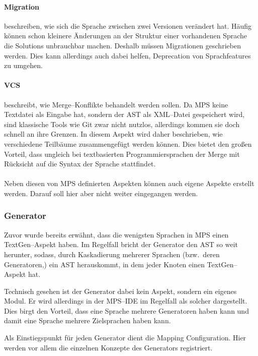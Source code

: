 \paragraph{Migration} beschreiben, wie sich die Sprache zwischen zwei Versionen verändert hat.
Häufig können schon kleinere Änderungen an der Struktur einer vorhandenen Sprache die Solutions unbrauchbar machen.
Deshalb müssen Migrationen geschrieben werden.
Dies kann allerdings auch dabei helfen, Deprecation von Sprachfeatures zu umgehen.

\paragraph{\ac{VCS}} beschreibt, wie Merge--Konflikte behandelt werden sollen.
Da \ac{MPS} keine Textdatei als Eingabe hat, sondern der \ac{AST} als \acs{XML}--Datei gespeichert wird, sind klassische Tools wie Git zwar nicht nutzlos, allerdings kommen sie doch schnell an ihre Grenzen.
In diesem Aspekt wird daher beschrieben, wie verschiedene Teilbäume zusammengefügt werden können.
Dies bietet den großen Vorteil, dass ungleich bei textbasierten Programmiersprachen der Merge mit Rücksicht auf die Syntax der Sprache stattfindet.

\paragraph*{}
Neben diesen von \ac{MPS} definierten Aspekten können auch eigene Aspekte erstellt werden.
Darauf soll hier aber nicht weiter eingegangen werden.

\subsubsection{Generator}
Zuvor wurde bereits erwähnt, dass die wenigsten Sprachen in \ac{MPS} einen TextGen--Aspekt haben.
Im Regelfall bricht der Generator den \ac{AST} so weit herunter, sodass, durch Kaskadierung mehrerer Sprachen (bzw.\ deren Generatoren,) ein \ac{AST} herauskommt, in dem jeder Knoten einen TextGen--Aspekt hat.

Technisch gesehen ist der Generator dabei kein Aspekt, sondern ein eigenes Modul.
Er wird allerdings in der \acs{MPS}--\acs{IDE} im Regelfall als solcher dargestellt.
Dies birgt den Vorteil, dass eine Sprache mehrere Generatoren haben kann und damit eine Sprache mehrere Zielsprachen haben kann.

Als Einstiegspunkt für jeden Generator dient die {\ttfamily Mapping Configuration}.
Hier werden vor allem die einzelnen Konzepte des Generators registriert.

